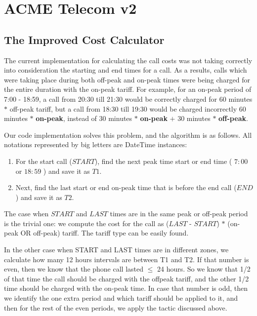 \documentclass[11pt,twocolumn]{article} %
\begin{document}
\section{ACME Telecom v2}

\subsection{The Improved Cost Calculator}

The current implementation for calculating the call costs was not taking correctly into consideration 
the starting and end times for a call. As a results, calls which were taking place during both off-peak and 
on-peak times were being charged for the entire duration with the on-peak tariff. For example, for an on-peak
period of 7:00 - 18:59, a call from 20:30 till 21:30 would be correctly charged for 60 minutes $\ast$
off-peak tariff, but a call from  18:30 till 19:30 would be charged incorrectly 60 minutes $\ast$ \textbf{on-peak},
instead of 30 minutes $\ast$ \textbf{on-peak} $+$ 30 minutes $\ast$ \textbf{off-peak}.

Our code implementation solves this problem, and the algorithm is as follows. All notations represented by big letters 
are DateTime instances:
\begin{enumerate}
\item{For the start call ($START$), find the next peak time start or end time ( $7:00$ or $18:59$ ) and save it as $T1$.}

\item{Next, find the last start or end on-peak time that is before the end call ($END$) and save it as $T2$.}
\end{enumerate}

The case when $START$ and $LAST$ times are in the same peak or off-peak period is the trivial one: we compute the 
cost for the call as ($LAST$ - $START$) $\ast$ (on-peak OR off-peak) tariff. The tariff type can be easily found. 

In the other case when START and LAST times are in different zones, we calculate how many 12 hours intervals are between T1 and T2.
If that number is even, then we know that the phone call lasted $\leq$ 24 hours. So we know that 1/2 of that time the call should be 
charged with the offpeak tariff, and the other 1/2 time should be charged with the on-peak time. 
In case that number is odd, then we identify the one extra period and which tariff should be applied to it, and then for the rest of the 
even periods, we apply the tactic discussed above. 
\end{document}
